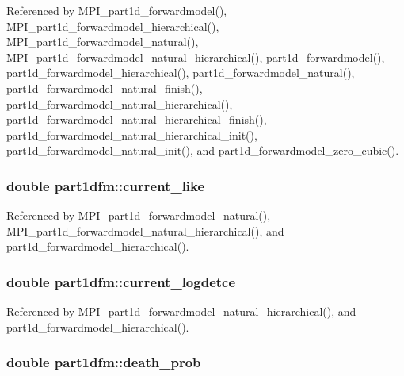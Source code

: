 Referenced by M\+P\+I\+\_\+part1d\+\_\+forwardmodel(), M\+P\+I\+\_\+part1d\+\_\+forwardmodel\+\_\+hierarchical(), M\+P\+I\+\_\+part1d\+\_\+forwardmodel\+\_\+natural(), M\+P\+I\+\_\+part1d\+\_\+forwardmodel\+\_\+natural\+\_\+hierarchical(), part1d\+\_\+forwardmodel(), part1d\+\_\+forwardmodel\+\_\+hierarchical(), part1d\+\_\+forwardmodel\+\_\+natural(), part1d\+\_\+forwardmodel\+\_\+natural\+\_\+finish(), part1d\+\_\+forwardmodel\+\_\+natural\+\_\+hierarchical(), part1d\+\_\+forwardmodel\+\_\+natural\+\_\+hierarchical\+\_\+finish(), part1d\+\_\+forwardmodel\+\_\+natural\+\_\+hierarchical\+\_\+init(), part1d\+\_\+forwardmodel\+\_\+natural\+\_\+init(), and part1d\+\_\+forwardmodel\+\_\+zero\+\_\+cubic().

\subsubsection[{\texorpdfstring{current\+\_\+like}{current_like}}]{\setlength{\rightskip}{0pt plus 5cm}double part1dfm\+::current\+\_\+like}\hypertarget{structpart1dfm_aa8a7065c3963903b5e5ccc88489e6cb8}{}\label{structpart1dfm_aa8a7065c3963903b5e5ccc88489e6cb8}


Referenced by M\+P\+I\+\_\+part1d\+\_\+forwardmodel\+\_\+natural(), M\+P\+I\+\_\+part1d\+\_\+forwardmodel\+\_\+natural\+\_\+hierarchical(), and part1d\+\_\+forwardmodel\+\_\+hierarchical().

\subsubsection[{\texorpdfstring{current\+\_\+logdetce}{current_logdetce}}]{\setlength{\rightskip}{0pt plus 5cm}double part1dfm\+::current\+\_\+logdetce}\hypertarget{structpart1dfm_aeb4eb5c676abbb3b7c7f58c5761e6e65}{}\label{structpart1dfm_aeb4eb5c676abbb3b7c7f58c5761e6e65}


Referenced by M\+P\+I\+\_\+part1d\+\_\+forwardmodel\+\_\+natural\+\_\+hierarchical(), and part1d\+\_\+forwardmodel\+\_\+hierarchical().

\subsubsection[{\texorpdfstring{death\+\_\+prob}{death_prob}}]{\setlength{\rightskip}{0pt plus 5cm}double part1dfm\+::death\+\_\+prob}\hypertarget{structpart1dfm_aadcbcceb1c0659ff7c3bf730b2ca1bc9}{}\label{structpart1dfm_aadcbcceb1c0659ff7c3bf730b2ca1bc9}



